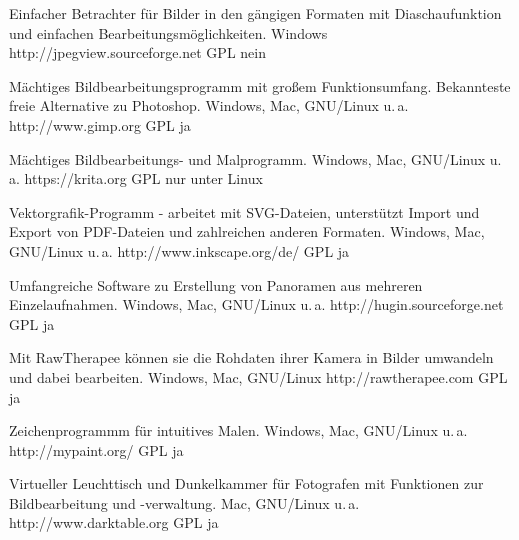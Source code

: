 



{Einfacher Betrachter für Bilder in den gängigen Formaten mit Diaschaufunktion und einfachen Bearbeitungsmöglichkeiten.}
{Windows}
{http://jpegview.sourceforge.net}
{GPL}
{nein}

{Mächtiges Bildbearbeitungsprogramm mit großem Funktionsumfang. Bekannteste freie Alternative zu Photoshop.}
{Windows, Mac, GNU/Linux u.\,a.}
{http://www.gimp.org}
{GPL}
{ja}

{Mächtiges Bildbearbeitungs- und Malprogramm.}
{Windows, Mac, GNU/Linux u.\,a.}
{https://krita.org}
{GPL}
{nur unter Linux}

{Vektorgrafik-Programm - arbeitet mit SVG-Dateien, unterstützt Import und Export von PDF-Dateien und zahlreichen anderen Formaten.}
{Windows, Mac, GNU/Linux u.\,a.}
{http://www.inkscape.org/de/}
{GPL}
{ja}


{Umfangreiche Software zu Erstellung von Panoramen aus mehreren Einzelaufnahmen.}
{Windows, Mac, GNU/Linux u.\,a.}
{http://hugin.sourceforge.net}
{GPL}
{ja}

{Mit RawTherapee können sie die Rohdaten ihrer Kamera in Bilder umwandeln und dabei bearbeiten.}
{Windows, Mac, GNU/Linux}
{http://rawtherapee.com}
{GPL}
{ja}

{Zeichenprogrammm für intuitives Malen.}
{Windows, Mac, GNU/Linux u.\,a.}
{http://mypaint.org/}
{GPL}
{ja}

{Virtueller Leuchttisch und Dunkelkammer für Fotografen mit Funktionen zur Bildbearbeitung und -verwaltung.}
{Mac, GNU/Linux u.\,a.}
{http://www.darktable.org}
{GPL}
{ja}

\backpage


